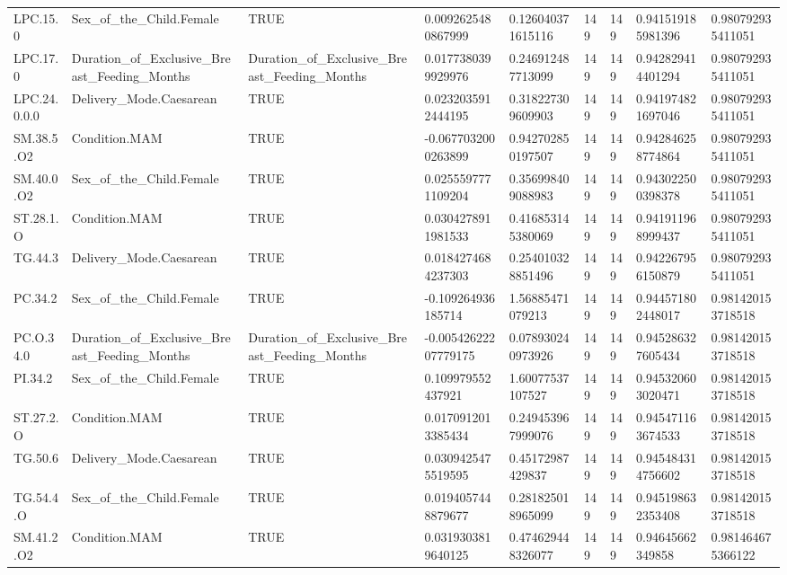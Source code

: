 \begin{longtable}{lllllllll}
LPC.15.0 & Sex\_of\_the\_Child.Female & TRUE & 0.0092625480867999 & 0.126040371615116 & 149 & 149 & 0.941519185981396 & 0.980792935411051 \\
LPC.17.0 & Duration\_of\_Exclusive\_Breast\_Feeding\_Months & Duration\_of\_Exclusive\_Breast\_Feeding\_Months & 0.0177380399929976 & 0.246912487713099 & 149 & 149 & 0.942829414401294 & 0.980792935411051 \\
LPC.24.0.0.0 & Delivery\_Mode.Caesarean & TRUE & 0.0232035912444195 & 0.318227309609903 & 149 & 149 & 0.941974821697046 & 0.980792935411051 \\
SM.38.5.O2 & Condition.MAM & TRUE & -0.0677032000263899 & 0.942702850197507 & 149 & 149 & 0.942846258774864 & 0.980792935411051 \\
SM.40.0.O2 & Sex\_of\_the\_Child.Female & TRUE & 0.0255597771109204 & 0.356998409088983 & 149 & 149 & 0.943022500398378 & 0.980792935411051 \\
ST.28.1.O & Condition.MAM & TRUE & 0.0304278911981533 & 0.416853145380069 & 149 & 149 & 0.941911968999437 & 0.980792935411051 \\
TG.44.3 & Delivery\_Mode.Caesarean & TRUE & 0.0184274684237303 & 0.254010328851496 & 149 & 149 & 0.942267956150879 & 0.980792935411051 \\
PC.34.2 & Sex\_of\_the\_Child.Female & TRUE & -0.109264936185714 & 1.56885471079213 & 149 & 149 & 0.944571802448017 & 0.981420153718518 \\
PC.O.34.0 & Duration\_of\_Exclusive\_Breast\_Feeding\_Months & Duration\_of\_Exclusive\_Breast\_Feeding\_Months & -0.00542622207779175 & 0.078930240973926 & 149 & 149 & 0.945286327605434 & 0.981420153718518 \\
PI.34.2 & Sex\_of\_the\_Child.Female & TRUE & 0.109979552437921 & 1.60077537107527 & 149 & 149 & 0.945320603020471 & 0.981420153718518 \\
ST.27.2.O & Condition.MAM & TRUE & 0.0170912013385434 & 0.249453967999076 & 149 & 149 & 0.945471163674533 & 0.981420153718518 \\
TG.50.6 & Delivery\_Mode.Caesarean & TRUE & 0.0309425475519595 & 0.45172987429837 & 149 & 149 & 0.945484314756602 & 0.981420153718518 \\
TG.54.4.O & Sex\_of\_the\_Child.Female & TRUE & 0.0194057448879677 & 0.281825018965099 & 149 & 149 & 0.945198632353408 & 0.981420153718518 \\
SM.41.2.O2 & Condition.MAM & TRUE & 0.0319303819640125 & 0.474629448326077 & 149 & 149 & 0.94645662349858 & 0.981464675366122 \\

\end{longtable}
